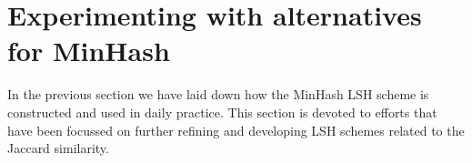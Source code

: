 

\section{Experimenting with alternatives for MinHash}
\label{section:lit:variations_minhash}
In the previous section we have laid down how the MinHash LSH scheme is constructed and used in daily practice. This section is devoted to efforts that have been focussed on further refining and developing LSH schemes related to the Jaccard similarity.


